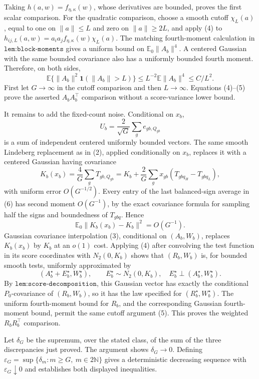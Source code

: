 Taking \(h(a,w)=f_{\eta,\kappa}(w)\), whose derivatives are bounded, proves the first scalar comparison.  For the quadratic comparison, choose a smooth cutoff \(\chi_L(a)\), equal to one on \(\|a\|\leq L\) and zero on \(\|a\|\geq2L\), and apply (4) to
\(h_{ij,L}(a,w)=a_ia_jf_{\eta,\kappa}(w)\chi_L(a)\).  The matching fourth-moment calculation in \(\texttt{lem:block-moments}\) gives a uniform bound on \(\mathbb E_0\|A_b\|^4\).  A centered Gaussian with the same bounded covariance also has a uniformly bounded fourth moment.  Therefore, on both sides,
\[
 \mathbb E\{\|A_b\|^2\mathbf1(\|A_b\|>L)\}
 \leq L^{-2}\mathbb E\|A_b\|^4\leq C/L^2.             \tag{5}
\]
First let \(G\to\infty\) in the cutoff comparison and then \(L\to\infty\).  Equations (4)--(5) prove the asserted \(A_bA_b^\top\) comparison without a score-variance lower bound.

It remains to add the fixed-count noise.  Conditional on \(x_b\),
\[
 U_b=\frac2{\sqrt G}\sum_ge_{gb,Q_{gb}}
\]
is a sum of independent centered uniformly bounded vectors.  The same smooth Lindeberg replacement as in (2), applied conditionally on \(x_b\), replaces it with a centered Gaussian having covariance
\[
 K_b(x_b)=\frac4G\sum_gT_{gb,Q_{gb}}
 =K_b+\frac2G\sum_gx_{gb}(T_{gbq_H}-T_{gbq_L}),                 \tag{6}
\]
with uniform error \(O(G^{-1/2})\).  Every entry of the last balanced-sign average in (6) has second moment \(O(G^{-1})\), by the exact covariance formula for sampling half the signs and boundedness of \(T_{gbq}\).  Hence
\[
 \mathbb E_0\|K_b(x_b)-K_b\|^2=O(G^{-1}).                     \tag{7}
\]
Gaussian covariance interpolation (3), conditional on \((A_b,W_b)\), replaces \(K_b(x_b)\) by \(K_b\) at an \(o(1)\) cost.  Applying (4) after convolving the test function in its score coordinates with \(N_2(0,K_b)\) shows that \((R_b,W_b)\) is, for bounded smooth tests, uniformly approximated by
\[
 (A_b^\star+E_b^\star,W_b^\star),
 \qquad E_b^\star\sim N_2(0,K_b),
 \quad E_b^\star\perp(A_b^\star,W_b^\star).
\]
By \(\texttt{lem:score-decomposition}\), this Gaussian vector has exactly the conditional \(P_0\)-covariance of \((R_b,W_b)\), so it has the law specified for \((R_b^\star,W_b^\star)\).  The uniform fourth-moment bound for \(R_b\), and the corresponding Gaussian fourth-moment bound, permit the same cutoff argument (5).  This proves the weighted \(R_bR_b^\top\) comparison.

Let \(\delta_G\) be the supremum, over the stated class, of the sum of the three discrepancies just proved.  The argument shows \(\delta_G\to0\).  Defining
\(\varepsilon_G=\sup\{\delta_m:m\geq G,\ m\in2\mathbb N\}\) gives a deterministic decreasing sequence with \(\varepsilon_G\downarrow0\) and establishes both displayed inequalities.